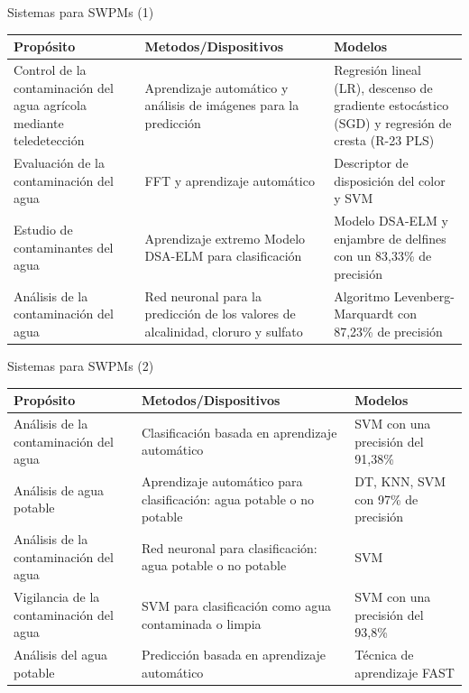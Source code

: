 \documentclass[aspectratio=169,compress]{beamer}
\begin{document}
\begin{frame}{Sistemas para SWPMs (1)}
\begin{center}
\footnotesize
\begin{tabular}{p{4.5cm}|p{4.5cm}|p{4.5cm}}
\hline
\textbf{Propósito} & \textbf{Metodos/Dispositivos} & \textbf{Modelos} \\
\hline

Control de la contaminación del agua agrícola mediante teledetección &
Aprendizaje automático y análisis de imágenes para la predicción &
Regresión lineal (LR), descenso de gradiente estocástico (SGD) y regresión de cresta (R-23 PLS)\\  \hline

Evaluación de la contaminación del agua &
FFT y aprendizaje automático &
Descriptor de disposición del color y SVM \\  \hline

Estudio de contaminantes del agua &
Aprendizaje extremo Modelo DSA-ELM para clasificación  &
Modelo DSA-ELM y enjambre de delfines con un 83,33\% de precisión \\  \hline

Análisis de la contaminación del agua &
Red neuronal para la predicción de los valores de alcalinidad, cloruro y sulfato &
Algoritmo Levenberg-Marquardt con 87,23\% de precisión \\  \hline

\end{tabular}
\end{center}

\end{frame}


\begin{frame}{Sistemas para SWPMs (2)}
\begin{center}
\footnotesize
\begin{tabular}{p{4.5cm}|p{4.5cm}|p{4.5cm}}
\hline
\textbf{Propósito} & \textbf{Metodos/Dispositivos} & \textbf{Modelos} \\
\hline

Análisis de la contaminación del agua &
Clasificación basada en aprendizaje automático &
SVM con una precisión del 91,38\%  \\  \hline

Análisis de agua potable &
Aprendizaje automático para clasificación: agua potable o no potable &
DT, KNN, SVM con 97\% de precisión  \\  \hline

Análisis de la contaminación del agua &
Red neuronal para clasificación: agua potable o no potable &
SVM \\  \hline

Vigilancia de la contaminación del agua &
SVM para clasificación como agua contaminada o limpia &
SVM con una precisión del 93,8\%  \\  \hline

Análisis del agua potable &
Predicción basada en aprendizaje automático &
Técnica de aprendizaje FAST \\  \hline

\end{tabular}
\end{center}

\end{frame}
\end{document}

